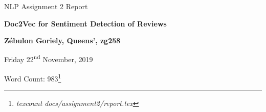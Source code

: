 \documentclass[12pt]{article}
\begin{document}
\centerline{\large NLP Assignment 2 Report}
\vspace{0.1in}
\centerline{\Large\bf Doc2Vec for Sentiment Detection of Reviews}
\vspace{0.1in}
\centerline{\large {\bf{Z\'ebulon Goriely, Queens', zg258}}}
\vspace{0.1in}
\centerline{\large{Friday 22\textsuperscript{nd} November, 2019}}
\vspace{0.05in}
\centerline{Word Count: 983\footnote{\emph{texcount docs/assignment2/report.tex}}}
\vspace{0.2in}

\makeatletter
\newenvironment{tablehere}
  {\def\@captype{table}}
  {}

\newenvironment{figurehere}
  {\def\@captype{figure}}
  {}
\makeatother
\end{document}

